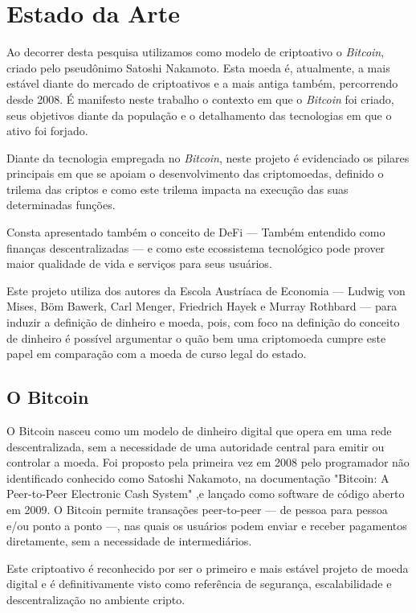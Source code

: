 \chapter{Estado da Arte}
Ao decorrer desta pesquisa utilizamos como modelo de criptoativo o \textit{Bitcoin}, criado pelo pseudônimo Satoshi Nakamoto. Esta moeda é, atualmente, a mais estável diante do mercado de criptoativos e a mais antiga também, percorrendo desde 2008. É manifesto neste trabalho o contexto em que o \textit{Bitcoin} foi criado, seus objetivos diante da população e o detalhamento das tecnologias em que o ativo foi forjado.

Diante da tecnologia empregada no \textit{Bitcoin}, neste projeto é evidenciado os pilares principais em que se apoiam o desenvolvimento das criptomoedas, definido o trilema das criptos e como este trilema impacta na execução das suas determinadas funções.

Consta apresentado também o conceito de DeFi — Também entendido como finanças descentralizadas — e como este ecossistema tecnológico pode prover maior qualidade de vida e serviços para seus usuários.

Este projeto utiliza dos autores da Escola Austríaca de Economia — Ludwig von Mises, Böm Bawerk, Carl Menger, Friedrich Hayek e Murray Rothbard — para induzir a definição de dinheiro e moeda, pois, com foco na definição do conceito de dinheiro é possível argumentar o quão bem uma criptomoeda cumpre este papel em comparação com a moeda de curso legal do estado. 

\section{O Bitcoin} \label{sec:bitcoin}
O Bitcoin nasceu como um modelo de dinheiro digital que opera em uma rede descentralizada, sem a necessidade de uma autoridade central para emitir ou controlar a moeda. Foi proposto pela primeira vez em 2008 pelo programador não identificado conhecido como Satoshi Nakamoto, na documentação "Bitcoin: A Peer-to-Peer Electronic Cash System" \cite{Nakamoto2009} ,e lançado como software de código aberto em 2009. O Bitcoin permite transações peer-to-peer — de pessoa para pessoa e/ou ponto a ponto —, nas quais os usuários podem enviar e receber pagamentos diretamente, sem a necessidade de intermediários.

Este criptoativo é reconhecido por ser o primeiro e mais estável projeto de moeda digital e é definitivamente visto como referência de segurança, escalabilidade e descentralização no ambiente cripto.

